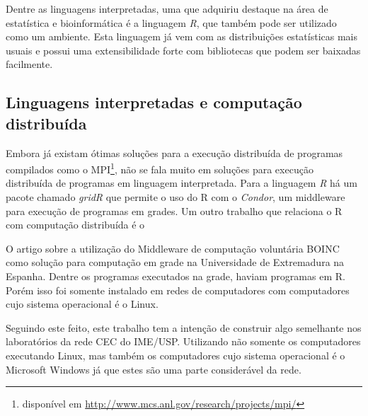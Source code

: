 \documentclass[a4paper,12pt,titlepage]{article}
\begin{document}
Dentre as linguagens interpretadas, uma que adquiriu destaque na área de estatística e bioinformática é a linguagem \emph{R}, que também 
pode ser utilizado como um ambiente. Esta linguagem já vem com as distribuições estatísticas mais usuais e possui uma extensibilidade 
forte com bibliotecas que podem ser baixadas facilmente.


\subsection{Linguagens interpretadas e computação distribuída}

Embora já existam ótimas soluções para a execução distribuída de programas compilados como o MPI\footnote{disponível em \url{http://www.mcs.anl.gov/research/projects/mpi/}}, não se fala muito em soluções para execução distribuída de programas em linguagem interpretada. 
Para a linguagem \emph{R} há um pacote chamado \emph{gridR} que permite o uso do R com o \emph{Condor}, %
um middleware para execução de programas em grades.  Um outro trabalho que relaciona o R com computação distribuída é o %


O artigo %
sobre a utilização do Middleware de computação voluntária BOINC como solução para computação 
em grade na Universidade de Extremadura na Espanha. Dentre os programas executados na grade, haviam
programas em R. Porém isso foi somente instalado em redes de computadores com computadores cujo sistema
operacional é o Linux. 

Seguindo este feito, este trabalho tem a intenção de construir algo semelhante nos laboratórios da rede CEC do IME/USP. Utilizando
não somente os computadores executando Linux, mas também os computadores cujo sistema operacional é o Microsoft Windows %
já que estes são uma parte considerável da rede.  
\end{document}
